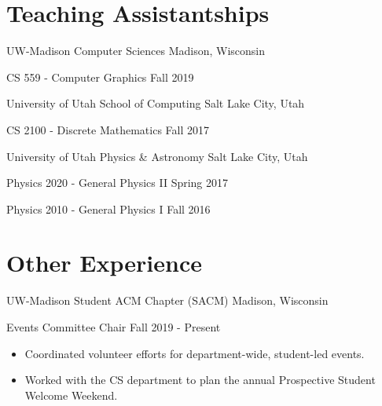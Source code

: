 \section*{Teaching Assistantships}

\begin{tab1} UW-Madison Computer Sciences \> Madison, Wisconsin \end{tab1}

\begin{tab2} CS 559 - Computer Graphics \> Fall 2019 \end{tab2}

\blockskip

\begin{tab1} University of Utah School of Computing \> Salt Lake City, Utah \end{tab1}

\begin{tab2} CS 2100 - Discrete Mathematics \> Fall 2017 \end{tab2}

\blockskip

\begin{tab1} University of Utah Physics \& Astronomy \> Salt Lake City, Utah \end{tab1}

\begin{tab2} Physics 2020 - General Physics II \> Spring 2017 \end{tab2}

\begin{tab2} Physics 2010 - General Physics I \> Fall 2016 \end{tab2}

\section*{Other Experience}

\begin{tab1} UW-Madison Student ACM Chapter (SACM) \> Madison, Wisconsin \end{tab1}

\begin{tab2} Events Committee Chair \> Fall 2019 - Present \end{tab2}
\begin{itemize}
    \item Coordinated volunteer efforts for department-wide, student-led events.
    \item Worked with the CS department to plan the annual Prospective Student Welcome Weekend.
\end{itemize}

